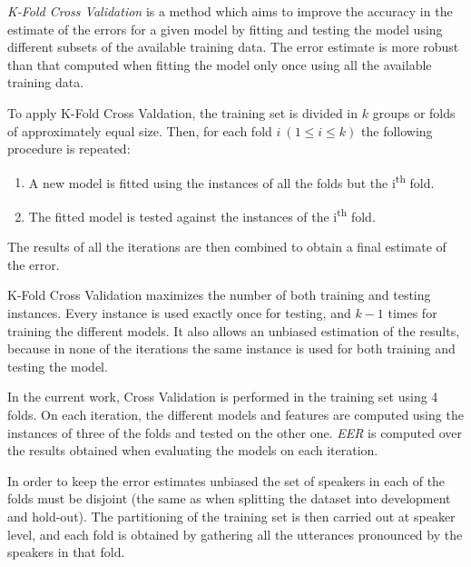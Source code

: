 \textit{K-Fold Cross Validation} \cite{svm_jwht}
is a method which aims to improve the accuracy in the
estimate of the errors for a given model by fitting and testing the model using different
subsets of the available training data. The error estimate is more robust than
that computed when fitting the model only once using all the available training data.

To apply K-Fold Cross Valdation,
the training set is divided in $k$ groups or folds of approximately equal size.
Then, for each fold $i \ (1 \leq i \leq k)$ the following procedure is repeated:

\begin{enumerate}
  \item A new model is fitted using the instances of all the folds but the i\textsuperscript{th} fold.
  \item The fitted model is tested against the instances of the i\textsuperscript{th} fold.
\end{enumerate}

The results of all the iterations are then combined to obtain a final estimate of the error.

K-Fold Cross Validation maximizes the number of both training and testing instances.
Every instance is used exactly once for testing, and $k-1$ times for training the different
models. It also allows an unbiased estimation of the results,
because in none of the iterations the same instance is used for both training and testing the
model.

In the current work, Cross Validation is performed in the training set using 4 folds.
On each iteration, the different models and features are computed using the instances of
three of the folds and tested on the other one. \textit{EER} is computed over the results obtained
when evaluating the models on each iteration.

In order to keep the error estimates unbiased
the set of speakers in each of the folds must be disjoint (the same as
when splitting the dataset into development and hold-out).
The partitioning of the training set
is then carried out at speaker level, and each fold is obtained by gathering all the
utterances pronounced by the speakers in that fold.